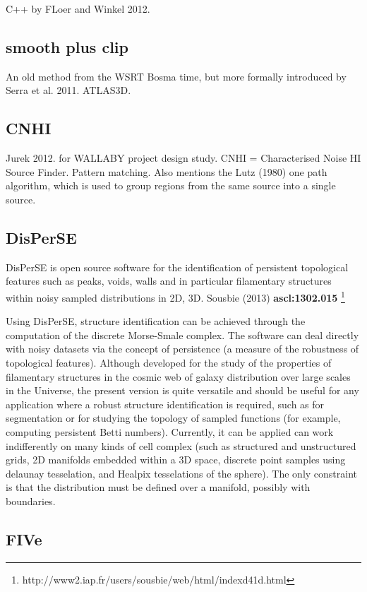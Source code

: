 \documentclass[preprint]{aastex} %
\begin{document}
C++ by FLoer and Winkel 2012.

\subsection{smooth plus clip}

An old method from the WSRT Bosma time, but more formally
introduced by Serra et al. 2011. ATLAS3D.

\subsection{CNHI}

Jurek 2012. for WALLABY project design study. CNHI = 
Characterised Noise HI Source Finder. Pattern matching. Also mentions the
Lutz (1980) one path algorithm, which is used to group regions from
the same source into a single source.


\subsection{DisPerSE}

DisPerSE is open source software for the identification of persistent
topological features such as peaks, voids, walls and in particular
filamentary structures within noisy sampled distributions in 2D,
3D. Sousbie (2013) {\bf ascl:1302.015}
\footnote{http://www2.iap.fr/users/sousbie/web/html/indexd41d.html}
 

Using DisPerSE, structure identification can be achieved through
the computation of the discrete Morse-Smale complex. The software can
deal directly with noisy datasets via the concept of persistence (a
measure of the robustness of topological features). Although developed
for the study of the properties of filamentary structures in the
cosmic web of galaxy distribution over large scales in the Universe,
the present version is quite versatile and should be useful for any
application where a robust structure identification is required, such
as for segmentation or for studying the topology of sampled functions
(for example, computing persistent Betti numbers). Currently, it can
be applied can work indifferently on many kinds of cell complex (such
as structured and unstructured grids, 2D manifolds embedded within a
3D space, discrete point samples using delaunay tesselation, and
Healpix tesselations of the sphere). The only constraint is that the
distribution must be defined over a manifold, possibly with
boundaries.

\subsection{FIVe}
\end{document}
